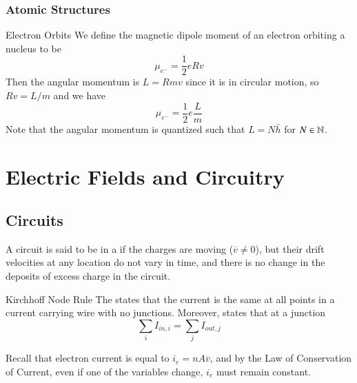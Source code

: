 \documentclass[12pt]{report}
\begin{document}
\subsection{Atomic Structures}

\begin{defn}{Electron Orbits}{}
        We define the magnetic dipole moment of an electron orbiting a nucleus to be \begin{equation}
                \mu_{e^-} = \frac{1}{2}eRv
        \end{equation}
        Then the angular momentum is $L = Rmv$ since it is in circular motion, so $Rv = L/m$ and we have \begin{equation}
                \mu_{e^-} = \frac{1}{2}e\frac{L}{m}
        \end{equation}
        Note that the angular momentum is quantized such that $L = N\bar{h}$ for $N \in \mathbb N$.
\end{defn}





\chapter{Electric Fields and Circuitry}

\section{Circuits}

\begin{defn}{}{}
        A circuit is said to be in a  if the charges are moving ($\overline{v} \neq 0$), but their drift velocities at any location do not vary in time, and there is no change in the deposits of excess charge in the circuit.
\end{defn}

\begin{thm}{Kirchhoff Node Rule}{}
        The  states that the current is the same at all points in a current carrying wire with no junctions. Moreover,  states that at a junction \begin{equation}
                \sum_i I_{in,i} = \sum_j I_{out,j}
        \end{equation}
\end{thm}

\begin{rec}{}{}
        Recall that electron current is equal to $i_e = nA\overline{v}$, and by the Law of Conservation of Current, even if one of the variables change, $i_e$ must remain constant.
\end{rec}
\end{document}
